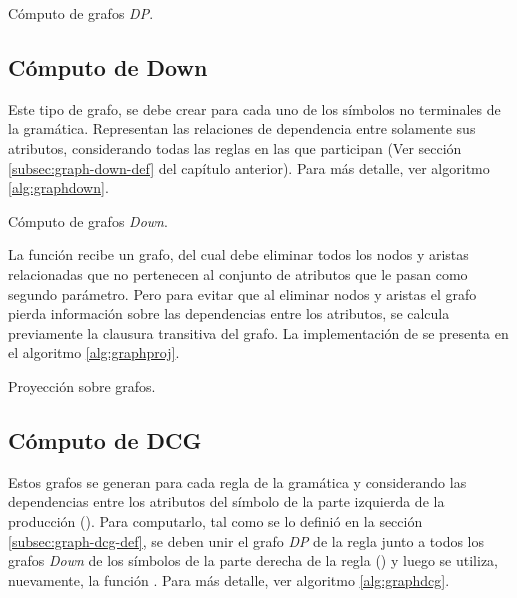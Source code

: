 \begin{algorithm}[!ht]

\vspace{-0.5cm}
\caption{\label{alg:graphdp}Cómputo de grafos \textit{DP}.}
\end{algorithm}

\subsection{Cómputo de Down}
\label{subsec:alg-DOWN}
Este tipo de grafo, se debe crear para cada uno de los símbolos no terminales de la gramática. Representan las relaciones de dependencia entre solamente sus atributos, considerando todas las reglas en las que participan (Ver sección \ref{subsec:graph-down-def} del capítulo anterior). Para más detalle, ver algoritmo \ref{alg:graphdown}.

\begin{algorithm}[!ht]

\vspace{-0.5cm}
\caption{\label{alg:graphdown}Cómputo de grafos \textit{Down}.}
\end{algorithm}

La función  recibe un grafo, del cual debe eliminar todos los nodos y aristas relacionadas que no pertenecen al conjunto de atributos que le pasan como segundo parámetro. Pero para evitar que al eliminar nodos y aristas el grafo pierda información sobre las dependencias entre los atributos, se calcula previamente la clausura transitiva del grafo. La implementación de  se presenta en el algoritmo \ref{alg:graphproj}.

\begin{algorithm}[!ht]

\vspace{-0.5cm}
\caption{\label{alg:graphproj}Proyección sobre grafos.}
\end{algorithm}

\subsection{Cómputo de DCG}
\label{subsec:alg-DCG}
Estos grafos se generan para cada regla de la gramática y considerando las dependencias entre los atributos del símbolo de la parte izquierda de la producción (). Para computarlo, tal como se lo definió en la sección \ref{subsec:graph-dcg-def}, se deben unir el grafo \textit{DP} de la regla junto a todos los grafos \textit{Down} de los símbolos de la parte derecha de la regla () y luego se utiliza, nuevamente, la función . Para más detalle, ver algoritmo \ref{alg:graphdcg}.

